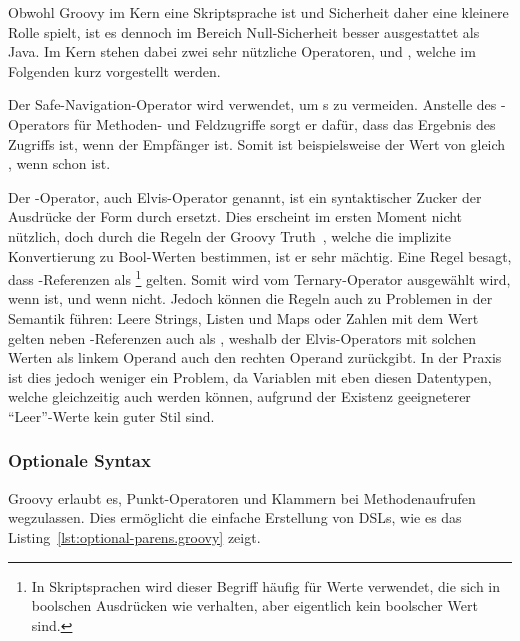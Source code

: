 Obwohl Groovy im Kern eine Skriptsprache ist und Sicherheit daher eine kleinere Rolle spielt, ist es dennoch im Bereich Null-Sicherheit besser ausgestattet als Java.
Im Kern stehen dabei zwei sehr nützliche Operatoren,  und , welche im Folgenden kurz vorgestellt werden.

Der Safe-Navigation-Operator  wird verwendet, um s zu vermeiden.
Anstelle des -Operators für Methoden- und Feldzugriffe sorgt er dafür, dass das Ergebnis des Zugriffs  ist, wenn der Empfänger  ist.
Somit ist beispielsweise der Wert von  gleich , wenn  schon  ist.

Der -Operator, auch Elvis-Operator genannt, ist ein syntaktischer Zucker der Ausdrücke der Form  durch  ersetzt.
Dies erscheint im ersten Moment nicht nützlich, doch durch die Regeln der Groovy Truth~\cite[Abs.~5.]{groovy-lang:semantics}, welche die implizite Konvertierung zu Bool-Werten bestimmen, ist er sehr mächtig.
Eine Regel besagt, dass -Referenzen als \footnote{In Skriptsprachen wird dieser Begriff häufig für Werte verwendet, die sich in boolschen Ausdrücken wie  verhalten, aber eigentlich kein boolscher Wert sind.} gelten.
Somit wird  vom Ternary-Operator ausgewählt wird, wenn   ist, und  wenn nicht.
Jedoch können die Regeln auch zu Problemen in der Semantik führen:
Leere Strings, Listen und Maps oder Zahlen mit dem Wert  gelten neben -Referenzen auch als , weshalb der Elvis-Operators mit solchen Werten als linkem Operand auch den rechten Operand zurückgibt.
In der Praxis ist dies jedoch weniger ein Problem, da Variablen mit eben diesen Datentypen, welche gleichzeitig auch  werden können, aufgrund der Existenz geeigneterer ``Leer''-Werte kein guter Stil sind.

\subsubsection{Optionale Syntax}\label{subsubsec:optionale-syntax}

Groovy erlaubt es, Punkt-Operatoren und Klammern bei Methodenaufrufen wegzulassen.
Dies ermöglicht die einfache Erstellung von DSLs, wie es das Listing~\ref{lst:optional-parens.groovy} zeigt.


